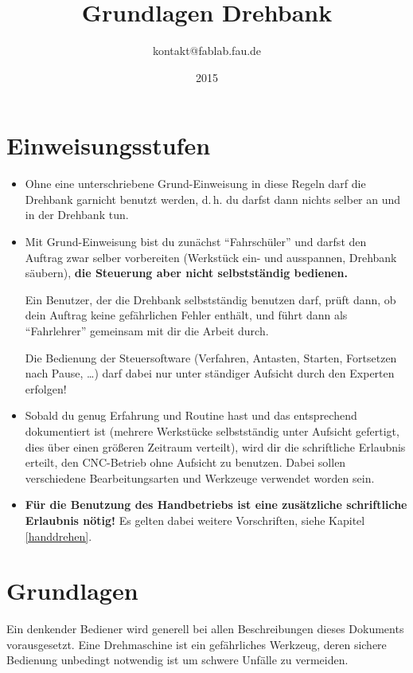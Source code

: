 \documentclass{\basedir/fablab-document}
\date{2015}
\author{kontakt@fablab.fau.de}
\title{Grundlagen Drehbank}
\begin{document}
\listoftodos

\tableofcontents

\newpage



\section{Einweisungsstufen}

\begin{itemize}
 \item Ohne eine unterschriebene Grund-Einweisung in diese Regeln darf die Drehbank garnicht benutzt werden, d.\,h. du darfst dann nichts selber an und in der Drehbank tun.
 \item Mit Grund-Einweisung bist du zunächst \enquote{Fahrschüler} und darfst den Auftrag zwar selber vorbereiten (Werkstück ein- und ausspannen, Drehbank säubern), \textbf{die Steuerung aber nicht selbstständig bedienen.} 

       Ein Benutzer, der die Drehbank selbstständig benutzen darf, prüft dann, ob dein Auftrag keine gefährlichen Fehler enthält, und führt dann als \enquote{Fahrlehrer} gemeinsam mit dir die Arbeit durch.

 Die Bedienung der Steuersoftware (Verfahren, Antasten, Starten, Fortsetzen nach Pause, \dots) darf dabei nur unter ständiger Aufsicht durch den Experten erfolgen!
 \item Sobald du genug Erfahrung und Routine hast und das entsprechend dokumentiert ist (mehrere Werkstücke selbstständig unter Aufsicht gefertigt, dies über einen größeren Zeitraum verteilt), wird dir die schriftliche Erlaubnis erteilt, den CNC-Betrieb ohne Aufsicht zu benutzen. Dabei sollen verschiedene Bearbeitungsarten und Werkzeuge verwendet worden sein.
 \item  \textbf{Für die Benutzung des Handbetriebs ist eine zusätzliche schriftliche Erlaubnis nötig!} Es gelten dabei weitere Vorschriften, siehe Kapitel \ref{handdrehen}.
\end{itemize}


\newpage
\section{Grundlagen}

Ein denkender Bediener wird generell bei allen Beschreibungen dieses Dokuments vorausgesetzt. Eine Drehmaschine ist ein gefährliches Werkzeug, deren sichere Bedienung unbedingt notwendig ist um schwere Unfälle zu vermeiden.
\end{document}
